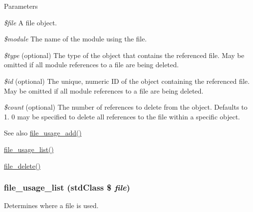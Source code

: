 \begin{DoxyParams}{Parameters}
\item[{\em \$file}]A file object. \item[{\em \$module}]The name of the module using the file. \item[{\em \$type}](optional) The type of the object that contains the referenced file. May be omitted if all module references to a file are being deleted. \item[{\em \$id}](optional) The unique, numeric ID of the object containing the referenced file. May be omitted if all module references to a file are being deleted. \item[{\em \$count}](optional) The number of references to delete from the object. Defaults to 1. 0 may be specified to delete all references to the file within a specific object.\end{DoxyParams}
\begin{DoxySeeAlso}{See also}
\hyperlink{group__file_ga41a98960234fa8f802cfc1c4c769ae05}{file\_\-usage\_\-add()} 

\hyperlink{group__file_ga6399c4096559ffbe81cfcb22db782bc4}{file\_\-usage\_\-list()} 

\hyperlink{group__file_gac7503f0dcdea965d68e4a242e7760921}{file\_\-delete()} 
\end{DoxySeeAlso}
\hypertarget{group__file_ga6399c4096559ffbe81cfcb22db782bc4}{
\subsubsection[{file\_\-usage\_\-list}]{\setlength{\rightskip}{0pt plus 5cm}file\_\-usage\_\-list (stdClass \$ {\em file})}}
\label{group__file_ga6399c4096559ffbe81cfcb22db782bc4}
Determines where a file is used.


